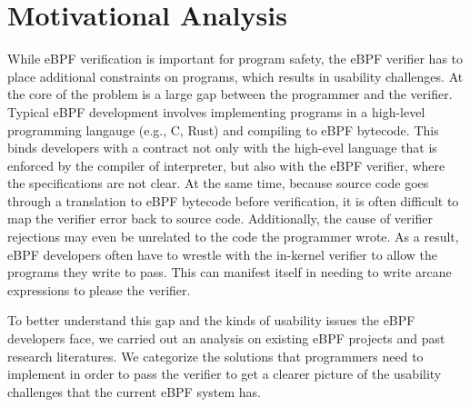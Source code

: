 \section{Motivational Analysis}
While eBPF verification is important for program safety, the eBPF verifier has
    to place additional constraints on programs, which results in usability
    challenges.
At the core of the problem is a large gap between the programmer and the
    verifier.
Typical eBPF development involves implementing programs in a high-level
    programming langauge (e.g., C, Rust) and compiling to eBPF bytecode.
This binds developers with a contract not only with the high-evel language
    that is enforced by the compiler of interpreter, but also with the eBPF
    verifier, where the specifications are not clear.
At the same time, because source code goes through a translation to eBPF
    bytecode before verification, it is often difficult to map the verifier
    error back to source code.
Additionally, the cause of verifier rejections may even be unrelated to the code the programmer wrote.
As a result, eBPF developers often have to wrestle with the in-kernel verifier
    to allow the programs they write to pass.
This can manifest itself in needing to write arcane expressions to please the
    verifier.

To better understand this gap and the kinds of usability issues the eBPF
    developers face, we carried out an analysis on existing eBPF projects and
    past research literatures.
We categorize the solutions that programmers need to implement in order to pass the verifier to get a clearer picture of the usability challenges that the current eBPF system has.

